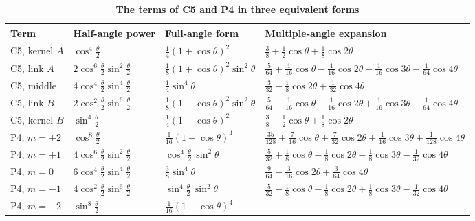 \documentclass[%
 reprint, amsmath,amssymb, aps, prb, ]{revtex4-2}
\numberwithin{equation}{section}
\begin{document}
\begin{table}[t!]
\centering
\caption{\textbf{The terms of C5 and P4 in three equivalent forms}}
\label{tab:terms}
\renewcommand{\arraystretch}{1.4}
\begin{tabular}{p{2.6cm}p{2.9cm}p{3.0cm}p{7.0cm}}
\toprule
\textbf{Term} & \textbf{Half-angle power} & \textbf{Full-angle form} & \textbf{Multiple-angle expansion} \\
\midrule
C5, kernel $A$
& $\cos^4\frac{\theta}{2}$
& $\frac14(1+\cos\theta)^2$
& $\frac38+\frac12\cos\theta+\frac18\cos2\theta$ \\
\addlinespace[0.3cm]
C5, link $A$
& $2\cos^6\frac{\theta}{2}\sin^2\frac{\theta}{2}$
& $\frac18(1+\cos\theta)^2\sin^2\theta$
& $\frac{5}{64}+\frac{1}{16}\cos\theta-\frac{1}{16}\cos2\theta-\frac{1}{16}\cos3\theta-\frac{1}{64}\cos4\theta$ \\
\addlinespace[0.3cm]
C5, middle
& $4\cos^4\frac{\theta}{2}\sin^4\frac{\theta}{2}$
& $\frac14\sin^4\theta$
& $\frac{3}{32}-\frac18\cos2\theta+\frac{1}{32}\cos4\theta$ \\
\addlinespace[0.3cm]
C5, link $B$
& $2\cos^2\frac{\theta}{2}\sin^6\frac{\theta}{2}$
& $\frac18(1-\cos\theta)^2\sin^2\theta$
& $\frac{5}{64}-\frac{1}{16}\cos\theta-\frac{1}{16}\cos2\theta+\frac{1}{16}\cos3\theta-\frac{1}{64}\cos4\theta$ \\
\addlinespace[0.3cm]
C5, kernel $B$
& $\sin^4\frac{\theta}{2}$
& $\frac14(1-\cos\theta)^2$
& $\frac38-\frac12\cos\theta+\frac18\cos2\theta$ \\
\midrule
P4, $m=+2$
& $\cos^8\frac{\theta}{2}$
& $\frac{1}{16}(1+\cos\theta)^4$
& $\frac{35}{128}+\frac{7}{16}\cos\theta+\frac{7}{32}\cos2\theta+\frac{1}{16}\cos3\theta+\frac{1}{128}\cos4\theta$ \\
\addlinespace[0.3cm]
P4, $m=+1$
& $4\cos^6\frac{\theta}{2}\sin^2\frac{\theta}{2}$
& $\cos^4\frac{\theta}{2}\,\sin^2\theta$
& $\frac{5}{32}+\frac18\cos\theta-\frac18\cos2\theta-\frac18\cos3\theta-\frac{1}{32}\cos4\theta$ \\
\addlinespace[0.3cm]
P4, $m=0$
& $6\cos^4\frac{\theta}{2}\sin^4\frac{\theta}{2}$
& $\frac38\sin^4\theta$
& $\frac{9}{64}-\frac{3}{16}\cos2\theta+\frac{3}{64}\cos4\theta$ \\
\addlinespace[0.3cm]
P4, $m=-1$
& $4\cos^2\frac{\theta}{2}\sin^6\frac{\theta}{2}$
& $\sin^4\frac{\theta}{2}\,\sin^2\theta$
& $\frac{5}{32}-\frac18\cos\theta-\frac18\cos2\theta+\frac18\cos3\theta-\frac{1}{32}\cos4\theta$ \\
\addlinespace[0.3cm]
P4, $m=-2$
& $\sin^8\frac{\theta}{2}$
& $\frac{1}{16}(1-\cos\theta)^4$

\end{tabular}
\end{table}
\end{document}
